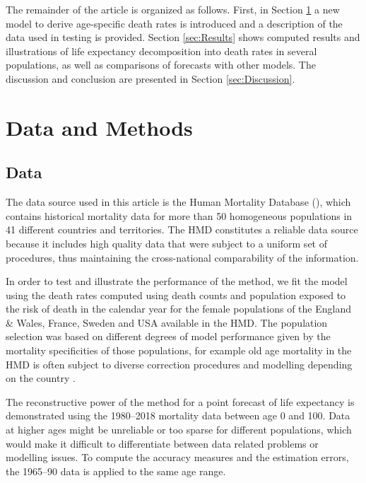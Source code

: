 \documentclass[risks,article,submit,moreauthors,pdftex]{Definitions/mdpi}
\begin{document}
The remainder of the article is organized as follows. First, in Section \ref{sec:DataMethods} a new model to derive age-specific death rates is introduced and a description of the data used in testing is provided. Section \ref{sec:Results} shows computed results and illustrations of life expectancy decomposition into death rates in several populations, as well as comparisons of forecasts with other models. The discussion and conclusion are presented in Section \ref{sec:Discussion}.
 
\section{Data and Methods}\label{sec:DataMethods}

\subsection{Data}\label{sec:Data}
The data source used in this article is the Human Mortality Database (\citeyear{HMD2020}), which contains historical mortality data for more than 50 homogeneous populations in 41 different countries and territories. The HMD constitutes a reliable data source because it includes high quality data that were subject to a uniform set of procedures, thus maintaining the cross-national comparability of the information.

In order to test and illustrate the performance of the method, we fit the model using the death rates computed using death counts and population exposed to the risk of death in the calendar year for the female populations of the England \& Wales, France, Sweden and USA available in the HMD. The population selection was based on different degrees of model performance given by the mortality specificities of those populations, for example old age mortality in the HMD is often subject to diverse correction procedures and modelling depending on the country \citep{wilmoth2007}. 

The reconstructive power of the method for a point forecast of life expectancy is demonstrated using the 1980--2018 mortality data between age 0 and 100. Data at higher ages might be unreliable or too sparse for different populations, which would make it difficult to differentiate between data related problems or modelling issues. To compute the accuracy measures and the estimation errors, the 1965--90 data is applied to the same age range.
\end{document}
